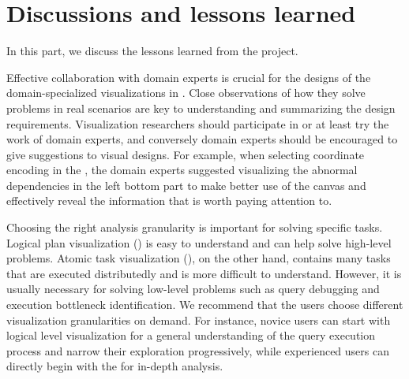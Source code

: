 \section{Discussions and lessons learned} \label{sec:discussion}

In this part, we discuss the lessons learned from the \qevis{} project.

Effective collaboration with domain experts is crucial for the designs of the domain-specialized visualizations in \qevis{}. Close observations of how they solve problems in real scenarios are key to understanding and summarizing the design requirements. Visualization researchers should participate in or at least try the work of domain experts, and conversely domain experts should be encouraged to give suggestions to visual designs. For example, when selecting coordinate encoding in the , the domain experts suggested visualizing the abnormal dependencies in the left bottom part to make better use of the canvas and effectively reveal the information that is worth paying attention to.


Choosing the right analysis granularity is important for solving specific tasks. Logical plan visualization () is easy to understand and can help solve high-level problems. Atomic task visualization (), on the other hand, contains many tasks that are executed distributedly and is more difficult to understand. However, it is usually necessary for solving low-level problems such as query debugging and execution bottleneck identification. 
We recommend that the users choose different visualization granularities on demand. 
For instance, novice users can start with logical level visualization for a general understanding of the query execution process and narrow their exploration progressively, while experienced users can directly begin with the  for in-depth analysis.



